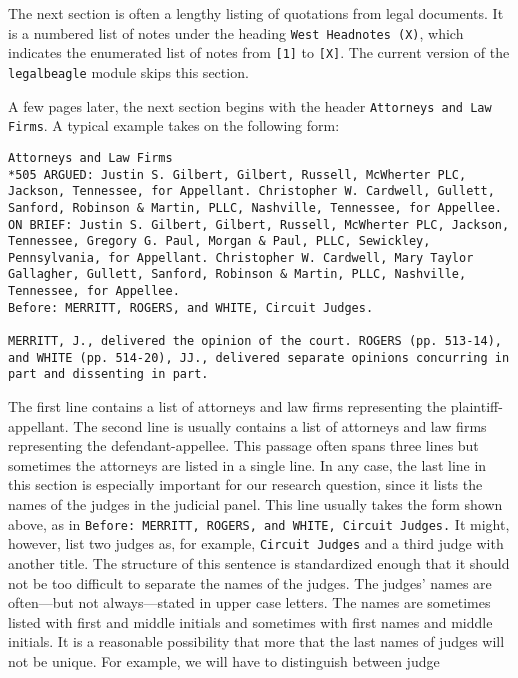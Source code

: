 \documentclass[11pt]{paper}
\begin{document}
The next section is often a lengthy listing of quotations from legal documents. 
It is a numbered list of notes under the heading \texttt{West Headnotes (X)}, 
which indicates the enumerated list of notes from \texttt{[1]} to \texttt{[X]}. 
The current version of the \texttt{legalbeagle} module skips this section. 

A few pages later, the next section begins with the header \texttt{Attorneys and Law Firms}. 
A typical example takes on the following form:
%
\begin{verbatim}
Attorneys and Law Firms
*505 ARGUED: Justin S. Gilbert, Gilbert, Russell, McWherter PLC, Jackson, Tennessee, for Appellant. Christopher W. Cardwell, Gullett, Sanford, Robinson & Martin, PLLC, Nashville, Tennessee, for Appellee. ON BRIEF: Justin S. Gilbert, Gilbert, Russell, McWherter PLC, Jackson, Tennessee, Gregory G. Paul, Morgan & Paul, PLLC, Sewickley, Pennsylvania, for Appellant. Christopher W. Cardwell, Mary Taylor Gallagher, Gullett, Sanford, Robinson & Martin, PLLC, Nashville, Tennessee, for Appellee.
Before: MERRITT, ROGERS, and WHITE, Circuit Judges.

MERRITT, J., delivered the opinion of the court. ROGERS (pp. 513-14), and WHITE (pp. 514-20), JJ., delivered separate opinions concurring in part and dissenting in part.

\end{verbatim}
%

The first line contains a list of attorneys and law firms representing the plaintiff-appellant. 
The second line is usually contains a list of attorneys and law firms representing the defendant-appellee. 
This passage often spans three lines but sometimes the attorneys are listed in a single line.
In any case, the last line in this section is especially important for our research question, 
since it lists the names of the judges in the judicial panel. 
This line usually takes the form shown above, 
as in \texttt{Before: MERRITT, ROGERS, and WHITE, Circuit Judges.}
It might, however, list two judges as, for example, \texttt{Circuit Judges}
and a third judge with another title. 
The structure of this sentence is standardized enough that 
it should not be too difficult to separate the names of the judges. 
The judges' names are often---but not always---stated in upper case letters. 
The names are sometimes listed with first and middle initials
and sometimes with first names and middle initials. 
It is a reasonable possibility that more that the last names of judges will not be unique. 
For example, we will have to distinguish between judge
\end{document}
